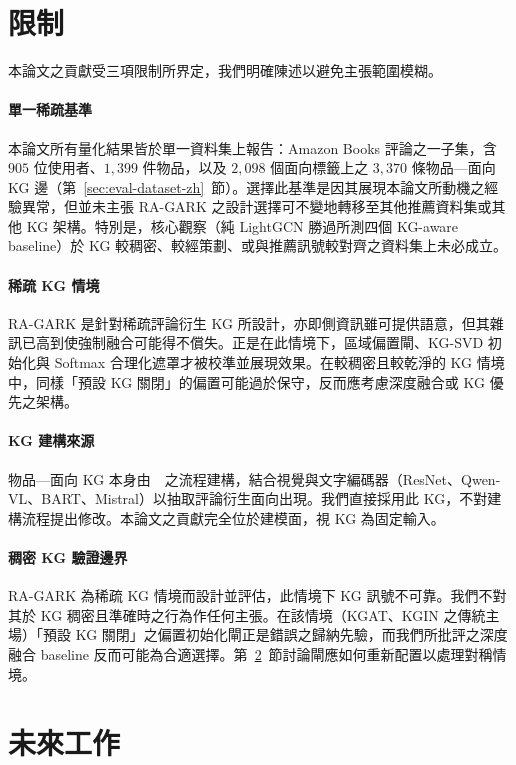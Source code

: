 \section{限制}
\label{sec:conclude-limits-zh}

本論文之貢獻受三項限制所界定，我們明確陳述以避免主張範圍模糊。

\paragraph{單一稀疏基準} 本論文所有量化結果皆於單一資料集上報告：Amazon Books 評論之一子集，含 $905$ 位使用者、$1{,}399$ 件物品，以及 $2{,}098$ 個面向標籤上之 $3{,}370$ 條物品—面向 KG 邊（第~\ref{sec:eval-dataset-zh}~節）。選擇此基準是因其展現本論文所動機之經驗異常，但並未主張 RA-GARK 之設計選擇可不變地轉移至其他推薦資料集或其他 KG 架構。特別是，核心觀察（純 LightGCN 勝過所測四個 KG-aware baseline）於 KG 較稠密、較經策劃、或與推薦訊號較對齊之資料集上未必成立。

\paragraph{稀疏 KG 情境} RA-GARK 是針對稀疏評論衍生 KG 所設計，亦即側資訊雖可提供語意，但其雜訊已高到使強制融合可能得不償失。正是在此情境下，區域偏置閘、KG-SVD 初始化與 Softmax 合理化遮罩才被校準並展現效果。在較稠密且較乾淨的 KG 情境中，同樣「預設 KG 關閉」的偏置可能過於保守，反而應考慮深度融合或 KG 優先之架構。

\paragraph{KG 建構來源} 物品—面向 KG 本身由~\cite{ho2024reviewkg}~之流程建構，結合視覺與文字編碼器（ResNet、Qwen-VL、BART、Mistral）以抽取評論衍生面向出現。我們直接採用此 KG，不對建構流程提出修改。本論文之貢獻完全位於建模面，視 KG 為固定輸入。

\paragraph{稠密 KG 驗證邊界} RA-GARK 為稀疏 KG 情境而設計並評估，此情境下 KG 訊號不可靠。我們不對其於 KG 稠密且準確時之行為作任何主張。在該情境（KGAT、KGIN 之傳統主場）「預設 KG 關閉」之偏置初始化閘正是錯誤之歸納先驗，而我們所批評之深度融合 baseline 反而可能為合適選擇。第~\ref{sec:conclude-future-zh}~節討論閘應如何重新配置以處理對稱情境。

\section{未來工作}
\label{sec:conclude-future-zh}

